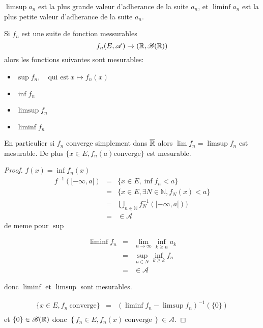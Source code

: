 \begin{remarque}
	$\limsup a_n$ est la plus grande valeur d'adherance de la suite $a_n$, et 
	$\liminf a_n$ est la plus petite valeur d'adherance de la suite $a_n$.
\end{remarque}

\begin{prop}
	Si $f_n$ est une suite de fonction messurables
	$$f_n (E,\mathscr{A}) \rightarrow (\mathbb{R},\mathscr{B}(\mathbb{R}))$$
	alors les fonctions suivantes sont mesurables:
	\begin{itemize}
        \item $\sup f_n, \quad \text{qui est} \ x\mapsto f_n(x) $
		\item $\inf f_n$
		\item $\limsup f_n$
		\item $\liminf f_n$
	\end{itemize}
	En particulier si $f_n$ converge simplement dans $\overline{\mathbb{R}}$ alors
	$\lim f_n = \limsup f_n$ est mesurable. De plus $\{ x \in E, f_n(a) \text{converge}\}$ est mesurable.
\end{prop}

\begin{proof}
	$f(x) = \inf f_n (x)$
	\begin{eqnarray*}
		f^{-1}([-\infty, a[) &=& \{x \in E, \inf f_n < a\} \\
		&=& \{x \in E, \exists N \in \mathbb{N}, f_N (x) < a \}\\
		&=& \bigcup\limits_{n\in \mathbb{N}}f_N^{-1}([-\infty, a[))\\
		&=& \in \mathscr{A}
	\end{eqnarray*}
	de meme pour $\sup$

	\begin{eqnarray*}
		\liminf f_n &=& \lim\limits_{n \to \infty}\inf\limits_{k \geq n } a_k\\
		&=& \sup _{n\in N} \inf_{k \geq k} f_n\\
		&=& \in \mathscr{A}
	\end{eqnarray*}

	donc $\liminf$ et $\limsup$ sont mesurables.

	\begin{eqnarray*}
		\{x \in E, f_n \  \text{converge} \}  &=& (\liminf f_n - \limsup f_n)^{-1}(\{0\})\\
	\end{eqnarray*}
	et $\{ 0 \} \in \mathscr{B}(\mathbb{R})$ donc $\left\{ f_n \in E, f_n(x) \ \text{converge} \ \right\} \in \mathscr{A}$.
\end{proof}

